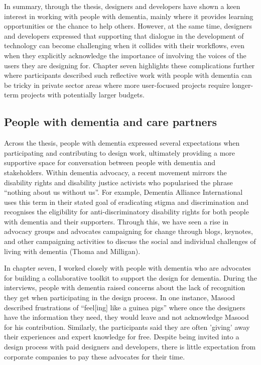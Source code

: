 In summary, through the thesis, designers and developers have shown a keen interest in working with people with dementia, mainly where it provides learning opportunities or the chance to help others. However, at the same time, designers and developers expressed that supporting that dialogue in the development of technology can become challenging when it collides with their workflows, even when they explicitly acknowledge the importance of involving the voices of the users they are designing for. Chapter seven highlights these complications further where participants described such reflective work with people with dementia can be tricky in private sector areas where more user-focused projects require longer-term projects with potentially larger budgets.

\subsection{People with dementia and care partners}
\label{PwDInterests}

Across the thesis, people with dementia expressed several expectations when participating and contributing to design work, ultimately providing a more supportive space for conversation between people with dementia and stakeholders. Within dementia advocacy, a recent movement mirrors the disability rights and disability justice activists who popularised the phrase ``nothing about us without us''. For example, Dementia Alliance International uses this term in their stated goal of eradicating stigma and discrimination and recognises the eligibility for anti-discriminatory disability rights for both people with dementia and their supporters. Through this, we have seen a rise in advocacy groups and advocates campaigning for change through blogs, keynotes, and other campaigning activities to discuss the social and individual challenges of living with dementia (Thoma and Milligan).

In chapter seven, I worked closely with people with dementia who are advocates for building a collaborative toolkit to support the design for dementia. During the interviews, people with dementia raised concerns about the lack of recognition they get when participating in the design process. In one instance, Masood described frustrations of ``feel[ing] like a guinea pigs'' where once the designers have the information they need, they would leave and not acknowledge Masood for his contribution. Similarly, the participants said they are often 'giving' away their experiences and expert knowledge for free. Despite being invited into a design process with paid designers and developers, there is little expectation from corporate companies to pay these advocates for their time.


